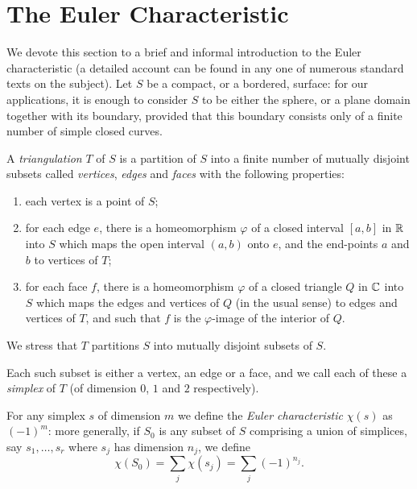 \section{The Euler Characteristic}
\label{sec:the_euler_characteristic}

We devote this section to a brief and informal introduction to the Euler
characteristic (a detailed account can be found in any one of numerous
standard texts on the subject). Let $S$ be a compact, or a bordered, surface:
for our applications, it is enough to consider $S$ to be either the sphere, or a
plane domain together with its boundary, provided that this boundary consists
only of a finite number of simple closed curves.

\begin{definition}
    A \emph{triangulation} $T$ of $S$ is a partition of $S$ into a finite number
    of mutually disjoint subsets called \emph{vertices}, \emph{edges} and
    \emph{faces} with the following properties:
    \begin{enumerate}[label=(\roman*)]
        \item each vertex is a point of $S$;
        \item for each edge $e$, there is a homeomorphism $\varphi$ of a closed
        interval $[a, b]$ in $\mathbb{R}$ into $S$ which maps the open interval $(a, b)$
        onto $e$, and the end-points $a$ and $b$ to vertices of $T$;
        \item for each face $f$, there is a homeomorphism $\varphi$ of a closed
        triangle $Q$ in $\mathbb{C}$ into $S$ which maps the edges and vertices of $Q$
        (in the usual sense) to edges and vertices of $T$, and such that $f$ is
        the $\varphi$-image of the interior of $Q$.
    \end{enumerate}
\end{definition}

We stress that $T$ partitions $S$ into mutually disjoint subsets of $S$.

\begin{definition}[Simplex]
    Each such subset is either a vertex, an edge or a face, and we call each of
    these a \emph{simplex} of $T$ (of dimension $0$, $1$ and $2$ respectively).
\end{definition}

\begin{definition}
    For any simplex $s$ of dimension $m$ we define the \emph{Euler
    characteristic} $\chi(s)$ as $(-1)^m$: more generally, if $S_0$ is any
    subset of $S$ comprising a union of simplices, say $s_1, \dots, s_r$ where
    $s_j$ has dimension $n_j$, we define
    \begin{equation*}
        \chi(S_0) = \sum_j \chi(s_j) = \sum_j (-1)^{n_j}.
    \end{equation*}
\end{definition}

